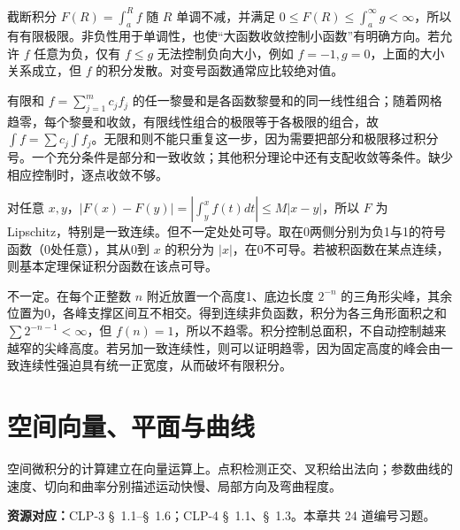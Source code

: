 \documentclass[UTF8,12pt,a4paper,fontset=fandol]{ctexart}
\begin{document}
\begin{solve}\label{ans:c30q17}
截断积分 $F(R)=\int_a^Rf$ 随 $R$ 单调不减，并满足 $0\le F(R)\le\int_a^\infty g<\infty$，所以有有限极限。非负性用于单调性，也使“大函数收敛控制小函数”有明确方向。若允许 $f$ 任意为负，仅有 $f\le g$ 无法控制负向大小，例如 $f=-1,g=0$，上面的大小关系成立，但 $f$ 的积分发散。对变号函数通常应比较绝对值。
\end{solve}

\begin{solve}\label{ans:c30q18}
有限和 $f=\sum_{j=1}^mc_jf_j$ 的任一黎曼和是各函数黎曼和的同一线性组合；随着网格趋零，每个黎曼和收敛，有限线性组合的极限等于各极限的组合，故 $\int f=\sum c_j\int f_j$。无限和则不能只重复这一步，因为需要把部分和极限移过积分号。一个充分条件是部分和一致收敛；其他积分理论中还有支配收敛等条件。缺少相应控制时，逐点收敛不够。
\end{solve}

\begin{solve}\label{ans:c30q19}
对任意 $x,y$，$|F(x)-F(y)|=|\int_y^xf(t)dt|\le M|x-y|$，所以 $F$ 为 Lipschitz，特别是一致连续。但不一定处处可导。取在0两侧分别为负1与1的符号函数（0处任意），其从0到 $x$ 的积分为 $|x|$，在0不可导。若被积函数在某点连续，则基本定理保证积分函数在该点可导。
\end{solve}

\begin{solve}\label{ans:c30q20}
不一定。在每个正整数 $n$ 附近放置一个高度1、底边长度 $2^{-n}$ 的三角形尖峰，其余位置为0，各峰支撑区间互不相交。得到连续非负函数，积分为各三角形面积之和 $\sum2^{-n-1}<\infty$，但 $f(n)=1$，所以不趋零。积分控制总面积，不自动控制越来越窄的尖峰高度。若另加一致连续性，则可以证明趋零，因为固定高度的峰会由一致连续性强迫具有统一正宽度，从而破坏有限积分。
\end{solve}

\clearpage
\section{空间向量、平面与曲线}\label{sec:ch31}
空间微积分的计算建立在向量运算上。点积检测正交、叉积给出法向；参数曲线的速度、切向和曲率分别描述运动快慢、局部方向及弯曲程度。

\textbf{资源对应：}CLP-3 \S~1.1--\S~1.6；CLP-4 \S~1.1、\S~1.3。本章共 24 道编号习题。
\end{document}
